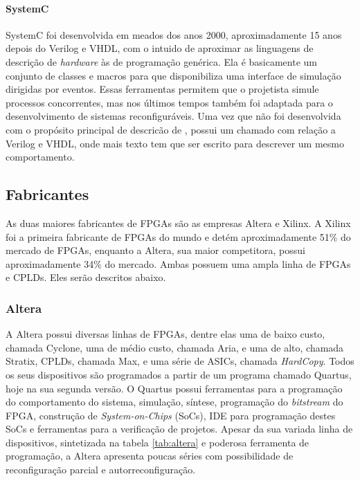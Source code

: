 \documentclass[11pt,a4paper,oneside]{book}
\begin{document}
\paragraph{SystemC}
SystemC foi desenvolvida em meados dos anos 2000, aproximadamente 15 anos depois do Verilog e VHDL, com o intuido de aproximar as linguagens de descri\c{c}\~ao de \textit{hardware} \`as de programa\c{c}\~ao gen\'erica.
Ela \'e basicamente um conjunto de classes e macros para  que disponibiliza uma interface de simula\c{c}\~ao dirigidas por eventos.
Essas ferramentas permitem que o projetista simule processos concorrentes, mas nos \'ultimos tempos tamb\'em foi adaptada para o desenvolvimento de sistemas reconfigur\'aveis.
Uma vez que n\~ao foi desenvolvida com o prop\'osito principal de descric\~ao de , possui um chamado  com rela\c{c}\~ao a Verilog e VHDL, onde mais texto tem que ser escrito para descrever um mesmo comportamento.

\subsection{Fabricantes}
As duas maiores fabricantes de FPGAs s\~ao as empresas Altera e Xilinx.
A Xilinx foi a primeira fabricante de FPGAs do mundo e det\'em aproximadamente 51\% do mercado de FPGAs, enquanto a Altera, sua maior competitora, possui aproximadamente 34\% do mercado.
Ambas possuem uma ampla linha de FPGAs e CPLDs.
Eles ser\~ao descritos abaixo.

\subsubsection{Altera}
A Altera possui diversas linhas de FPGAs, dentre elas uma de baixo custo, chamada Cyclone, uma de m\'edio custo, chamada Aria, e uma de alto, chamada Stratix, CPLDs, chamada Max, e uma s\'erie de ASICs, chamada \textit{HardCopy}.
Todos os seus dispositivos s\~ao programados a partir de um programa chamado Quartus, hoje na sua segunda vers\~ao.
O Quartus possui ferramentas para a programa\c{c}\~ao do comportamento do sistema, simula\c{c}\~ao, s\'i­ntese, programa\c{c}\~ao do \textit{bitstream} do FPGA, constru\c{c}\~ao de \textit{System-on-Chips} (SoCs), IDE para programa\c{c}\~ao destes SoCs e ferramentas para a verifica\c{c}\~ao de projetos.
Apesar da sua variada linha de dispositivos, sintetizada na tabela \ref{tab:altera} e poderosa ferramenta de programa\c{c}\~ao, a Altera apresenta poucas s\'eries com possibilidade de reconfigura\c{c}\~ao parcial e autorreconfigura\c{c}\~ao.
\end{document}
